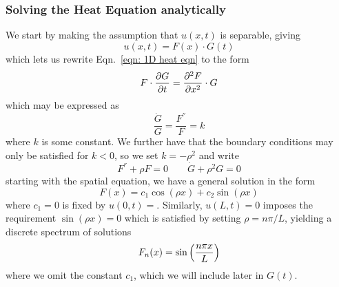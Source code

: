 \documentclass[reprint, english, nofootinbib]{revtex4-2}
\begin{document}
\subsubsection{Solving the Heat Equation analytically}
\noindent 

We start by making the assumption that $u(x, t)$ is separable, giving 
\begin{equation}
    u(x, t) = F(x) \cdot G(t)
\end{equation}
which lets us rewrite Eqn.~\ref{eqn: 1D heat eqn} to the form
\begin{equation}
    F \cdot \pdv{G}{t} = \pdv[2]{F}{x} \cdot G
\end{equation}
which may be expressed as
\begin{equation}
    \frac{\dot G}{G} = \frac{F^{''}}{F} = k
\end{equation}
where $k$ is some constant. We further have that the boundary conditions may only be satisfied for $k <  0$, so we set $k = -\rho^2$ and write
\begin{equation}
    F^{''} + \rho F = 0 \quad \quad \dot G + \rho^2G = 0
\end{equation}
starting with the spatial equation, we have a general solution in the form 
\begin{equation}
    F(x) = c_1 \cos(\rho x) + c_2 \sin(\rho x)
\end{equation}
where $c_1 = 0$ is fixed by $u(0, t) = $. Similarly, $u(L, t) = 0$ imposes the requirement $\sin(\rho x) = 0$ which is satisfied by setting $\rho = n\pi/L$, yielding a discrete spectrum of solutions
\begin{equation}
    F_n(x) = \sin\qty(\frac{n\pi x}{L})
\end{equation}
where we omit the constant $c_1$, which we will include later in $G(t)$. 
\end{document}
